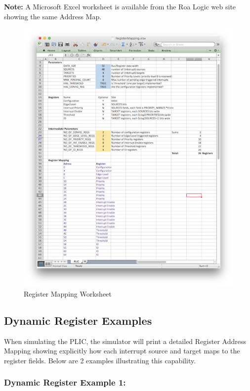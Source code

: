 \textbf{Note:} A Microsoft Excel worksheet is available from the Roa Logic web site showing the same Address Map.

\begin{figure}[!ht]
\includegraphics{assets/img/AHB-Lite_PLIC_Worksheet.png}
\caption{Register Mapping Worksheet}
\label{fig:WORKSHEET}
\end{figure}

\clearpage

\subsection{Dynamic Register Examples}

When simulating the PLIC, the simulator will print a detailed Register Address
Mapping showing explicitly how each interrupt source and target maps to the register fields. Below are 2 examples illustrating this capability.

\subsubsection{Dynamic Register Example 1:}\label{example-1}


